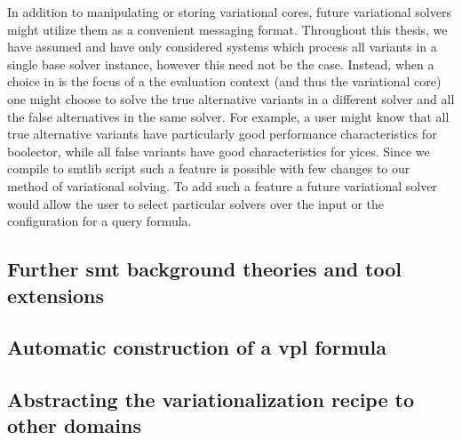 In addition to manipulating or storing variational cores, future variational
solvers might utilize them as a convenient messaging format. Throughout this
thesis, we have assumed and have only considered systems which process all
variants in a single base solver instance, however this need not be the case.
Instead, when a choice in is the focus of a the evaluation context (and thus the
variational core) one might choose to solve the true alternative variants in a
different solver and all the false alternatives in the same solver. For example,
a user might know that all true alternative variants have particularly good
performance characteristics for boolector, while all false variants have good
characteristics for yices. Since we compile to \acl{smtlib} script such a
feature is possible with few changes to our method of variational solving. To
add such a feature a future variational solver would allow the user to select
particular solvers over the input \vc{} or the configuration for a query
formula.

\subsection{Further \ac{smt} background theories and tool extensions}

\subsection{Automatic construction of a \ac{vpl} formula}

\subsection{Abstracting the variationalization recipe to other domains}



